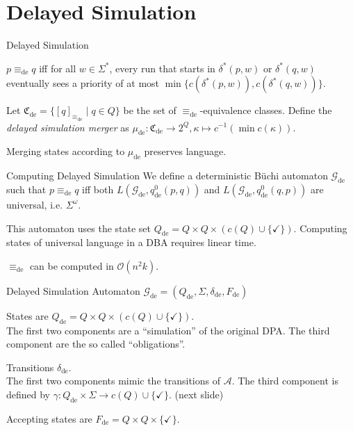 \section{Delayed Simulation}
\begin{frame}{Delayed Simulation}
\begin{defn}
	$p \equiv_\text{de} q$ iff for all $w \in \Sigma^*$, every run that starts in $\delta^*(p, w)$ or $\delta^*(q, w)$ eventually sees a priority of at most $\min \{c(\delta^*(p, w)), c(\delta^*(q, w))\}$.
\end{defn}

\begin{defn}
	Let $\mathfrak{C}_\text{de} = \{ [q]_{\equiv_\text{de}} \mid q \in Q \}$ be the set of $\equiv_\text{de}$-equivalence classes.	Define the \emph{delayed simulation merger} as $\mu_\text{de} : \mathfrak{C}_\text{de} \rightarrow 2^Q, \kappa \mapsto c^{-1}(\min c(\kappa))$.
\end{defn}

\begin{theorem}
	Merging states according to $\mu_\text{de}$ preserves language.
\end{theorem}
\end{frame}


\begin{frame}{Computing Delayed Simulation}
	We define a deterministic Büchi automaton $\mathcal{G}_\text{de}$ such that $p \equiv_\text{de} q$ iff both $L(\mathcal{G}_\text{de}, q_\text{de}^0(p, q))$ and $L(\mathcal{G}_\text{de}, q_\text{de}^0(q, p))$ are universal, i.e. $\Sigma^\omega$.
	
	This automaton uses the state set $Q_\text{de} = Q \times Q \times (c(Q) \cup \{\checkmark\})$. Computing states of universal language in a DBA requires linear time.
	
	\begin{theorem}
		$\equiv_\text{de}$ can be computed in $\mathcal{O}(n^2 k)$.
	\end{theorem}
\end{frame}

\begin{frame}{Delayed Simulation Automaton}
$\mathcal{G}_\text{de} = (Q_\text{de}, \Sigma, \delta_\text{de}, F_\text{de})$

States are $Q_\text{de} = Q \times Q \times (c(Q) \cup \{\checkmark\})$. \\
The first two components are a \enquote{simulation} of the original DPA. The third component are the so called \enquote{obligations}.

Transitions $\delta_\text{de}$. \\
The first two components mimic the transitions of $\mathcal{A}$. The third component is defined by $\gamma : Q_\text{de} \times \Sigma \rightarrow c(Q) \cup \{\checkmark\}$. (next slide)

Accepting states are $F_\text{de} = Q \times Q \times \{\checkmark\}$.

\end{frame}


